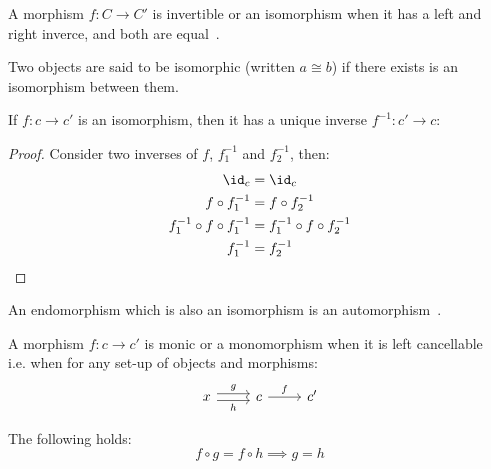 \begin{definition}
  A morphism $f: C\to C'$ is invertible or an isomorphism when it has a left and
  right inverce, and both are
  equal~\parencite[p.~19]{lane:working_mathematician}.
\end{definition}

\begin{remark}
  Two objects are said to be isomorphic (written $a\cong b$) if there exists is
  an isomorphism between them.
\end{remark}

\begin{theorem}
  If $f: c\to c'$ is an isomorphism, then it has a unique inverse $f^{-1}:c'\to
  c$:
  \begin{proof}
    Consider two inverses of $f$, $f^{-1}_1$ and $f^{-1}_2$, then:
    \[
      \begin{aligned}
        \id_c &= \id_c\\
        f\circ f^{-1}_1 &= f\circ f^{-1}_2\\
        f^{-1}_1 \circ f \circ f^{-1}_1 &= f^{-1}_1 \circ f \circ f^{-1}_2\\
        f^{-1}_1 &= f^{-1}_2
      \end{aligned}
    \]
  \end{proof}
\end{theorem}

\begin{definition}
  An endomorphism which is also an isomorphism is an
  automorphism~\parencite[p.~7]{riehl:category_theory_in_context}.
\end{definition}

\begin{definition}
  A morphism $f:c\to c'$ is monic or a monomorphism when it is left
  cancellable~\parencite[p.~19]{lane:working_mathematician} i.e. when for any
  set-up of objects and morphisms:
  \[\begin{tikzcd}[ampersand replacement=\&]
    x \& c \& {c'}
    \arrow["f", from=1-2, to=1-3]
    \arrow["g", shift left=1, from=1-1, to=1-2]
    \arrow["h"', shift right=1, from=1-1, to=1-2]
  \end{tikzcd}\]

  The following holds:
  \[f \circ g = f \circ h \implies g = h\]
\end{definition}

